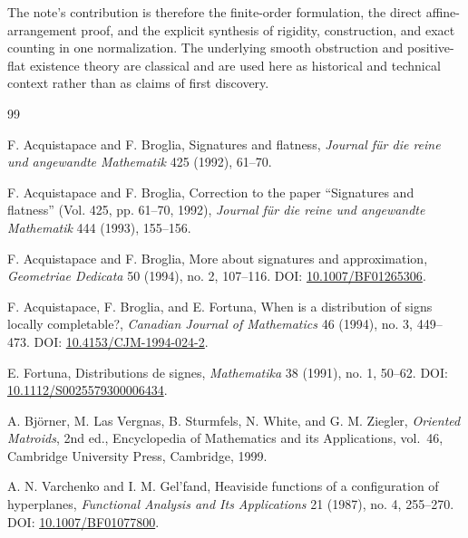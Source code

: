 \documentclass[11pt]{article}
\theoremstyle{definition}
\theoremstyle{remark}
\begin{document}
The note's contribution is therefore the finite-order formulation, the direct affine-arrangement proof, and the explicit synthesis of rigidity, construction, and exact counting in one normalization. The underlying smooth obstruction and positive-flat existence theory are classical and are used here as historical and technical context rather than as claims of first discovery.

\begin{thebibliography}{99}
\small\raggedright

F. Acquistapace and F. Broglia,
\newblock Signatures and flatness,
\newblock \emph{Journal f\"ur die reine und angewandte Mathematik} 425 (1992), 61--70.

F. Acquistapace and F. Broglia,
\newblock Correction to the paper ``Signatures and flatness'' (Vol. 425, pp. 61--70, 1992),
\newblock \emph{Journal f\"ur die reine und angewandte Mathematik} 444 (1993), 155--156.

F. Acquistapace and F. Broglia,
\newblock More about signatures and approximation,
\newblock \emph{Geometriae Dedicata} 50 (1994), no. 2, 107--116.
\newblock DOI: \href{https://doi.org/10.1007/BF01265306}{10.1007/BF01265306}.

F. Acquistapace, F. Broglia, and E. Fortuna,
\newblock When is a distribution of signs locally completable?,
\newblock \emph{Canadian Journal of Mathematics} 46 (1994), no. 3, 449--473.
\newblock DOI: \href{https://doi.org/10.4153/CJM-1994-024-2}{10.4153/CJM-1994-024-2}.

E. Fortuna,
\newblock Distributions de signes,
\newblock \emph{Mathematika} 38 (1991), no. 1, 50--62.
\newblock DOI: \href{https://doi.org/10.1112/S0025579300006434}{10.1112/S0025579300006434}.

A. Bj\"orner, M. Las Vergnas, B. Sturmfels, N. White, and G. M. Ziegler,
\newblock \emph{Oriented Matroids}, 2nd ed.,
\newblock Encyclopedia of Mathematics and its Applications, vol.~46, Cambridge University Press, Cambridge, 1999.

A. N. Varchenko and I. M. Gel'fand,
\newblock Heaviside functions of a configuration of hyperplanes,
\newblock \emph{Functional Analysis and Its Applications} 21 (1987), no. 4, 255--270.
\newblock DOI: \href{https://doi.org/10.1007/BF01077800}{10.1007/BF01077800}.


\end{thebibliography}
\end{document}
